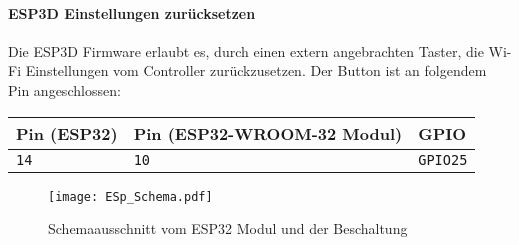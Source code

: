 \paragraph{ESP3D Einstellungen zurücksetzen}
Die ESP3D Firmware erlaubt es, durch einen extern angebrachten Taster, die Wi-Fi Einstellungen vom Controller zurückzusetzen. Der Button ist an folgendem Pin angeschlossen:

\begin{table}[h]
\small
	\begin{center}
	\def\arraystretch{1.3} \tabcolsep=12pt
		\begin{tabular}{|l|l|l|}
			\hline
			 \textbf{Pin (ESP32)} & \textbf{Pin (ESP32-WROOM-32 Modul)} & \textbf{GPIO} \\ \hline
			 \texttt{14} & \texttt{10} & \texttt{GPIO25} \\ \hline
		\end{tabular} 
	\end{center}
\end{table}



\begin{figure}[H]
	\centering
	\texttt{[image: ESp\_Schema.pdf]}
	\caption{Schemaausschnitt vom ESP32 Modul und der Beschaltung}
	\label{pic:ESP32_Schema}
\end{figure}

